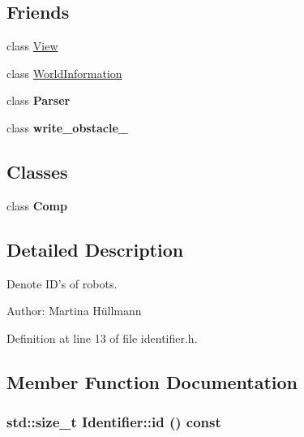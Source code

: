 \subsection*{Friends}
\begin{CompactItemize}
\item 
\hypertarget{class_identifier_018ff8a950133459fda57a235706a80b}{
class \hyperlink{class_identifier_018ff8a950133459fda57a235706a80b}{View}}
\label{class_identifier_018ff8a950133459fda57a235706a80b}

\item 
\hypertarget{class_identifier_d26290837413ac85ad8f757b518bbe77}{
class \hyperlink{class_identifier_d26290837413ac85ad8f757b518bbe77}{WorldInformation}}
\label{class_identifier_d26290837413ac85ad8f757b518bbe77}

\item 
\hypertarget{class_identifier_b80291af9c262f63b83fa9c16f12014d}{
class \textbf{Parser}}
\label{class_identifier_b80291af9c262f63b83fa9c16f12014d}

\item 
\hypertarget{class_identifier_1c533f013e578e25f6831e9076855ec8}{
class \textbf{write\_\-obstacle\_}}
\label{class_identifier_1c533f013e578e25f6831e9076855ec8}

\end{CompactItemize}
\subsection*{Classes}
\begin{CompactItemize}
\item 
class \textbf{Comp}
\end{CompactItemize}


\subsection{Detailed Description}
Denote ID's of robots. 

\begin{Desc}
\item[Author:]Martina Hüllmann \end{Desc}


Definition at line 13 of file identifier.h.

\subsection{Member Function Documentation}
\hypertarget{class_identifier_b60899833fdfebb88f78ecf4c71a2f78}{
\subsubsection[id]{\setlength{\rightskip}{0pt plus 5cm}std::size\_\-t Identifier::id () const}}
\label{class_identifier_b60899833fdfebb88f78ecf4c71a2f78}


